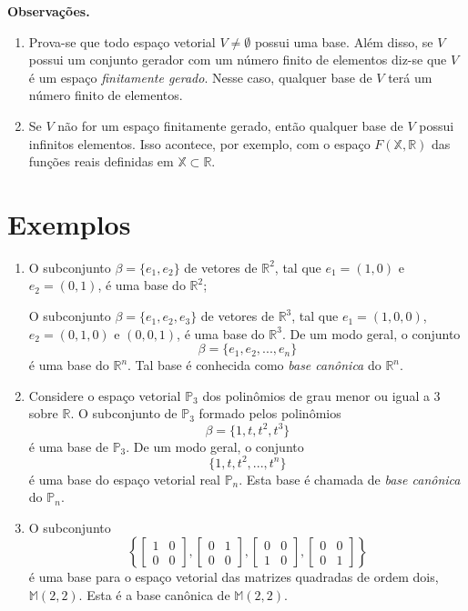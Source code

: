 \vspace{0.3cm}
\textbf{Observações.}
\begin{enumerate}
\item Prova-se que todo espaço vetorial $V\neq \emptyset$ possui uma base. Além disso, se $V$ possui um conjunto gerador com um número finito de elementos diz-se que $V$ é um espaço \textit{finitamente gerado}. Nesse caso, qualquer base de $V$ terá um número finito de elementos.

\item Se $V$ não for um espaço finitamente gerado, então qualquer base de $V$  possui infinitos elementos.  Isso acontece, por exemplo, com o espaço ${F}(\mathbb{X},\mathbb{R})$ das  funções reais definidas em $\mathbb{X} \subset \mathbb{R}$.
\end{enumerate}

\section{Exemplos}

\begin{enumerate}
\item  O subconjunto  $\beta=\{e_1, e_2 \}$  de vetores de $\mathbb{R}^2$,  tal que  $e_1=(1,0)$ e $e_2=(0,1)$,  é uma base do  $\mathbb{R}^2$;

O subconjunto  $\beta=\{e_1, e_2 , e_3\}$  de vetores de $\mathbb{R}^3$, tal que  $e_1=(1,0,0)$, $e_2=(0,1,0)$ e $(0,0,1)$,  é uma base do  $\mathbb{R}^3$. De um modo geral, o conjunto   $$\beta=\{e_1, e_2 ,..., e_n\}$$ é uma base do  $\mathbb{R}^n$.
Tal base é conhecida como \textit{base canônica} do $\mathbb{R}^n$.

\item   Considere o espaço vetorial  $\mathbb{P}_3$ dos polinômios de grau menor  ou igual a 3 sobre $\mathbb{R}$. O subconjunto de $\mathbb{P}_3$ formado pelos  polinômios $$\beta= \{1, t, t^2, t^3\}$$  é uma  base de $\mathbb{P}_3$.  De um modo geral, o conjunto $$\{1, t, t^2,..., t^n\}$$  é uma base do espaço vetorial real $\mathbb{P}_n$. Esta base é chamada de  \textit{base canônica} do $\mathbb{P}_n$.

\item O subconjunto $$\left\{ \begin{bmatrix} 1 & 0 \\ 0 & 0\end{bmatrix}, \begin{bmatrix} 0 & 1\\ 0 & 0\end{bmatrix},\begin{bmatrix}0 & 0 \\ 1 & 0 \end{bmatrix},  \begin{bmatrix}0 & 0 \\ 0 & 1 \end{bmatrix} \right\}$$  é uma base para o espaço vetorial das matrizes quadradas de ordem dois,  $\mathbb{M}(2,2)$. Esta é a base canônica de $\mathbb{M}(2,2)$.

\end{enumerate}



